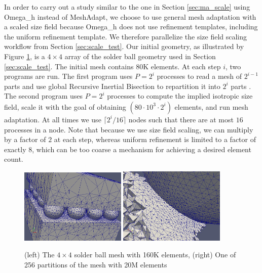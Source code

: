 In order to carry out a study similar to the one in Section \ref{sec:ma_scale}
using Omega\_h instead of MeshAdapt, we choose to use general mesh
adaptation with a scaled size field because Omega\_h does not use refinement
templates, including the uniform refinement template.
We therefore parallelize the size field scaling workflow from
Section \ref{sec:scale_test}.
Our initial geometry, as illustrated by Figure \ref{fig:osh_scale}, is
a $4\times 4$ array of the solder ball geometry used in Section \ref{sec:scale_test}.
The initial mesh contains 80K elements.
At each step $i$, two programs are run.
The first program uses $P=2^i$ processes to read a mesh of $2^{i-1}$
parts and use global Recursive Inertial Bisection to repartition it
into $2^i$ parts \cite{simon1991partitioning}.
The second program uses $P=2^i$ processes to compute the implied
isotropic size field, scale it with the goal of obtaining
$(80\cdot 10^3 \cdot 2^i)$ elements, and run mesh adaptation.
At all times we use $\lceil 2^i / 16 \rceil$ nodes such that there are
at most $16$ processes in a node.
Note that because we use size field scaling, we can multiply
by a factor of $2$ at each step, whereas uniform refinement
is limited to a factor of exactly $8$, which can be too coarse
a mechanism for achieving a desired element count.

\begin{figure}[t]\vspace*{4pt}
\centerline{
\includegraphics[width=0.45\textwidth]{sb_160k.png}
\includegraphics[width=0.45\textwidth]{sb_20480k_part40.png}
}
\caption{(left) The $4\times 4$ solder ball mesh with 160K elements,
(right) One of 256 partitions of the mesh with 20M elements}
\label{fig:osh_scale}
\end{figure}

